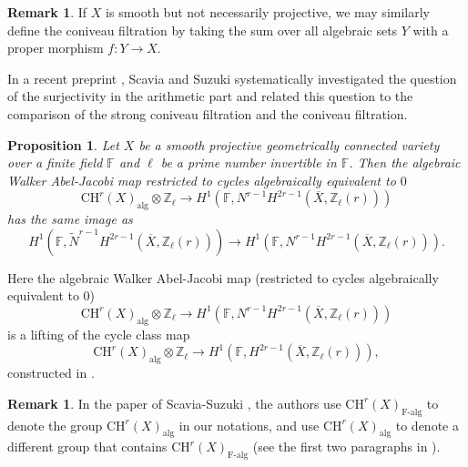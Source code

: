 \documentclass{amsart}
\newtheorem{prop}[theorem]{Proposition}
\theoremstyle{definition}
\newtheorem{rem}[theorem]{Remark}
\theoremstyle{remark}
\newcommand{\mbb}{\mathbb}
\newcommand{\FF}{\mbb{F}}
\newcommand{\ZZ}{\mbb{Z}}
\begin{document}
\begin{rem}
    If $X$ is smooth but not necessarily projective, we may similarly define the coniveau filtration by taking the sum over all algebraic sets $Y$ with a proper morphism $f: Y \to X$.
\end{rem}

In a recent preprint \cite{ScaviaSuzuki2023coniveau}, Scavia and Suzuki systematically investigated the question of the surjectivity in the arithmetic part and related this question to the comparison of the strong coniveau filtration and the coniveau filtration.

\begin{prop}\cite[Proposition 5.6]{ScaviaSuzuki2023coniveau}\label{thm:SS3}
Let $X$ be a smooth projective geometrically connected variety over a finite field $\FF$ and $\ell$ be a prime number invertible in $\FF$. Then the algebraic Walker Abel-Jacobi map restricted to cycles algebraically equivalent to $0$
\[
\text{CH}^r(X)_\text{alg}\otimes \ZZ_\ell  \to H^1(\FF , N^{r-1}H^{2r-1}(\overline{X}, \ZZ_\ell(r)))
\]
has the same image as
\[
H^1(\FF , \tilde{N}^{r-1}H^{2r-1}(\overline{X}, \ZZ_\ell(r))) \to H^1(\FF , {N}^{r-1}H^{2r-1}(\overline{X}, \ZZ_\ell(r))).
\]
\end{prop}
Here the algebraic Walker Abel-Jacobi map (restricted to cycles algebraically equivalent to $0$)
\[
\text{CH}^r(X)_\text{alg}\otimes \ZZ_\ell  \to H^1(\FF , N^{r-1}H^{2r-1}(\overline{X}, \ZZ_\ell(r)))
\]
is a lifting of the cycle class map 
\[
\text{CH}^r(X)_\text{alg}\otimes \ZZ_\ell  \to H^1(\FF , H^{2r-1}(\overline{X}, \ZZ_\ell(r))),
\]
constructed in \cite[Formula (4.2), Section 4.2]{ScaviaSuzuki2023coniveau}.
\begin{rem}
In the paper of Scavia-Suzuki \cite{ScaviaSuzuki2023coniveau}, the authors use $\text{CH}^r(X)_\text{F-alg}$ to denote the group $\text{CH}^r(X)_\text{alg}$ in our notations, and use $\text{CH}^r(X)_\text{alg}$ to denote a different group that contains $\text{CH}^r(X)_\text{F-alg}$ (see the first two paragraphs in \cite[Section 4.1]{ScaviaSuzuki2023coniveau}). 
\end{rem}
\end{document}
